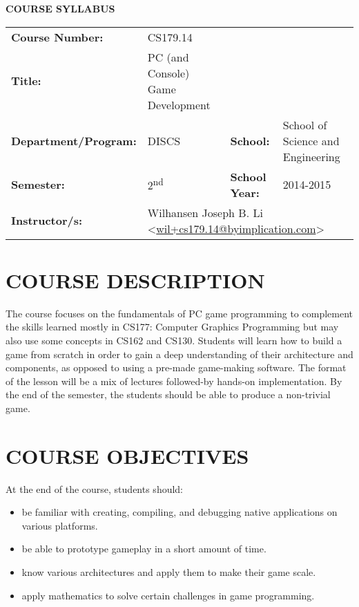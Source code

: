 \documentclass[10pt]{article}
\begin{document}
  \begin{center}
  	{\large\textbf{COURSE SYLLABUS}}\\
  \end{center}
	\begin{tabular}{l l l l}
		\textbf{Course Number:} & CS179.14\\
		\textbf{Title:} & PC (and Console) Game Development\\
		\textbf{Department/Program:} & DISCS & \textbf{School:} & School of Science and Engineering\\
		\textbf{Semester:} & 2\textsuperscript{nd} & \textbf{School Year:} & 2014-2015\\
		\textbf{Instructor/s:} & \multicolumn{3}{l}{Wilhansen Joseph B. Li <\url{wil+cs179.14@byimplication.com}>} \\
	\end{tabular}

\section{COURSE DESCRIPTION}
The course focuses on the fundamentals of PC game programming to complement the skills learned mostly in CS177: Computer Graphics Programming but may also use some concepts in CS162 and CS130. Students will learn how to build a game from scratch in order to gain a deep understanding of their architecture and components, as opposed to using a pre-made game-making software. The format of the lesson will be a mix of lectures followed-by hands-on implementation. By the end of the semester, the students should be able to produce a non-trivial game.

\section{COURSE OBJECTIVES}
At the end of the course, students should:
\begin{itemize}[noitemsep]
\item be familiar with creating, compiling, and debugging native applications on various platforms.
\item be able to prototype gameplay in a short amount of time.
\item know various architectures and apply them to make their game scale.
\item apply mathematics to solve certain challenges in game programming.
\end{itemize}
\end{document}
